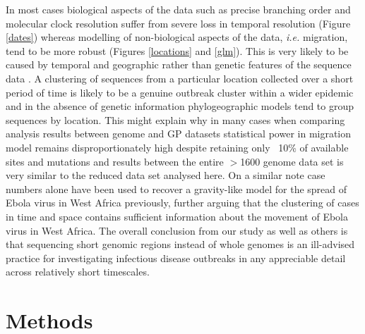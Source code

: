 \documentclass{bmcart}
\begin{document}
In most cases biological aspects of the data such as precise branching order and molecular clock resolution suffer from severe loss in temporal resolution (Figure \ref{dates}) whereas modelling of non-biological aspects of the data, \textit{i.e.} migration, tend to be more robust (Figures \ref{locations} and \ref{glm}).
This is very likely to be caused by temporal and geographic rather than genetic features of the sequence data \cite{boskova_influence_2018}.
A clustering of sequences from a particular location collected over a short period of time is likely to be a genuine outbreak cluster within a wider epidemic and in the absence of genetic information phylogeographic models tend to group sequences by location.
This might explain why in many cases when comparing analysis results between genome and GP datasets statistical power in migration model remains disproportionately high despite retaining only ~10\% of available sites and mutations and results between the entire $>$1600 genome data set \cite{dudas_virus_2017} is very similar to the reduced data set analysed here.
On a similar note case numbers alone have been used to recover a gravity-like model for the spread of Ebola virus in West Africa \cite{kramer_spatial_2016} previously, further arguing that the clustering of cases in time and space contains sufficient information about the movement of Ebola virus in West Africa.
The overall conclusion from our study as well as others \cite{wohl_co-circulating_2018} is that sequencing short genomic regions instead of whole genomes is an ill-advised practice for investigating infectious disease outbreaks in any appreciable detail across relatively short timescales.

\section*{Methods}
\end{document}
